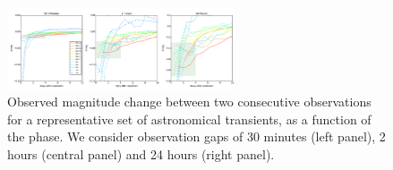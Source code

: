 \begin{figure}[hbt]
\centerline{
\includegraphics[width=0.6\textwidth]{figs/transients/earlyrise.pdf}
}
\caption{Observed magnitude change between two consecutive observations for a representative set of astronomical transients, as a function of the phase. We consider observation gaps of 30 minutes  (left panel), 2 hours (central panel) and 24 hours (right panel). 
}
\label{fig:earlyrise}
\end{figure}
